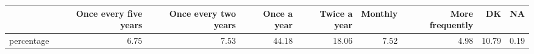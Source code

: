 \begin{table}[ht]
\centering
\begin{tabular}{rrrrrrrrr}
  \hline
 & Once every five years & Once every two years & Once a year & Twice a year & Monthly & More frequently & DK & NA \\ 
  \hline
percentage & 6.75 & 7.53 & 44.18 & 18.06 & 7.52 & 4.98 & 10.79 & 0.19 \\ 
   \hline
\end{tabular}
\end{table}
